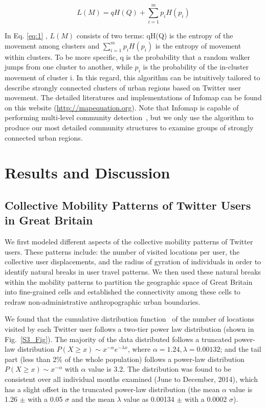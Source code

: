 \documentclass[10pt,letterpaper]{article}
\begin{document}
\begin{equation} \label{eq:1}
L(M)=qH(Q) + \sum_{i=1}^{m} p_{i}H(p_{i})
\end{equation}

In Eq. \eqref{eq:1} , $L(M)$ consists of two terms: qH(Q) is the entropy of the movement among clusters and $ \sum_{i=1}^{m} p_{i}H(p_{i})$ is the entropy of movement within clusters. 
To be more specific, q is the probability that a random walker jumps from one cluster to another, while $p_i$ is the probability of the in-cluster movement of cluster i.
In this regard, this algorithm can be intuitively tailored to describe strongly connected clusters of urban regions based on Twitter user movement.
The detailed literatures and implementations of Infomap can be found on this website (\url{http://mapequation.org}).
Note that Infomap is capable of performing multi-level community detection~\cite{domenico2015}, but we only use the algorithm to produce our most detailed community structures
to examine groups of strongly connected urban regions.

\section*{Results and Discussion}
\subsection*{Collective Mobility Patterns of Twitter Users in Great Britain}
We first modeled different aspects of the collective mobility patterns of Twitter users.
These patterns include: the number of visited locations per user,  the collective user displacements, and the radius of gyration of individuals in order to identify natural breaks in user travel patterns.
We then used these natural breaks within the mobility patterns to partition the geographic space of Great Britain into fine-grained cells and established the connectivity among these cells to redraw non-administrative anthropographic urban boundaries. 

We found that the cumulative distribution function~\cite{clauset2009} of the number of locations visited by each Twitter user follows a two-tier power law distribution (shown in Fig.~\ref{S3_Fig}). 
The majority of the data distributed follows a truncated power-law distribution $P(X\geq x)\sim x^{-\alpha}e^{-\lambda x}$, where $\alpha = 1.24, \lambda =0.00132$; and the tail part (less than 2$\%$ of the whole population) follows a power-law distribution  $P(X \geq x)\sim x^{-\alpha}$ with $\alpha$ value is 3.2.
The distribution was found to be consistent over all individual months examined (June to December, 2014), which has a slight offset in the truncated power-law distribution (the mean $\alpha$ value is 1.26 $ \pm$ with a 0.05 $\sigma$ and the mean $\lambda$ value as 0.00134 $ \pm$  with a 0.0002 $\sigma$). 
\end{document}
